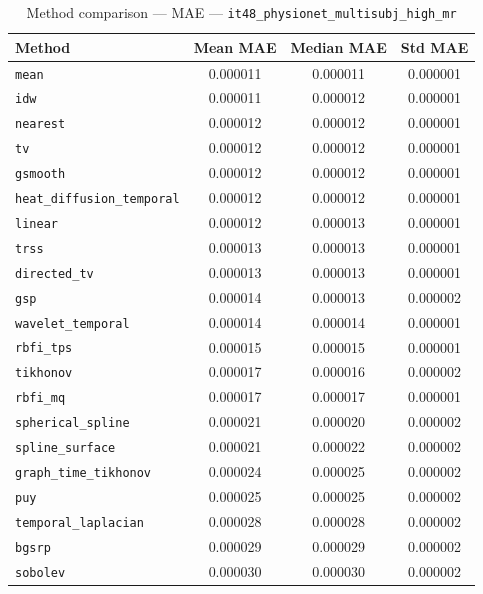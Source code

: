 \begin{table}[ht]
\centering
\caption{Method comparison — MAE — \texttt{it48_physionet_multisubj_high_mr}}
\label{tab:mae_it48_physionet_multisubj_high_mr}
\begin{tabular}{lccc}
\hline
Method & Mean MAE & Median MAE & Std MAE \\
\hline
\texttt{mean} & 0.000011 & 0.000011 & 0.000001 \\
\texttt{idw} & 0.000011 & 0.000012 & 0.000001 \\
\texttt{nearest} & 0.000012 & 0.000012 & 0.000001 \\
\texttt{tv} & 0.000012 & 0.000012 & 0.000001 \\
\texttt{gsmooth} & 0.000012 & 0.000012 & 0.000001 \\
\texttt{heat_diffusion_temporal} & 0.000012 & 0.000012 & 0.000001 \\
\texttt{linear} & 0.000012 & 0.000013 & 0.000001 \\
\texttt{trss} & 0.000013 & 0.000013 & 0.000001 \\
\texttt{directed_tv} & 0.000013 & 0.000013 & 0.000001 \\
\texttt{gsp} & 0.000014 & 0.000013 & 0.000002 \\
\texttt{wavelet_temporal} & 0.000014 & 0.000014 & 0.000001 \\
\texttt{rbfi_tps} & 0.000015 & 0.000015 & 0.000001 \\
\texttt{tikhonov} & 0.000017 & 0.000016 & 0.000002 \\
\texttt{rbfi_mq} & 0.000017 & 0.000017 & 0.000001 \\
\texttt{spherical_spline} & 0.000021 & 0.000020 & 0.000002 \\
\texttt{spline_surface} & 0.000021 & 0.000022 & 0.000002 \\
\texttt{graph_time_tikhonov} & 0.000024 & 0.000025 & 0.000002 \\
\texttt{puy} & 0.000025 & 0.000025 & 0.000002 \\
\texttt{temporal_laplacian} & 0.000028 & 0.000028 & 0.000002 \\
\texttt{bgsrp} & 0.000029 & 0.000029 & 0.000002 \\
\texttt{sobolev} & 0.000030 & 0.000030 & 0.000002 \\
\hline
\end{tabular}
\end{table}
